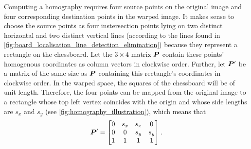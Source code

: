 \documentclass[../report.tex]{subfiles}
\begin{document}
Computing a homography requires four source points on the original image and four corresponding destination points in the warped image.
It makes sense to choose the source points as four instersection points lying on two distinct horizontal and two distinct vertical lines (according to the lines found in \cref{fig:board_localisation_line_detection_elimination}) because they represent a rectangle on the chessboard.
Let the $3 \times 4$ matrix ${\bm{P}}$ contain these points' homogenous coordinates as column vectors in clockwise order.
Further, let ${\bm{P}}'$ be a matrix of the same size as ${\bm{P}}$ containing this rectangle's coordinates in clockwise order.
In the warped space, the squares of the chessboard will be of unit length. 
Therefore, the four points can be mapped from the original image to a rectangle whose top left vertex coincides with the origin and whose side lengths are $s_x$ and $s_y$ (see \cref{fig:homography_illustration}), which means that
\begin{equation*}
    {\bm{P}}' = \begin{bmatrix}
        0 & s_x & s_x & 0 \\
        0 & 0 & s_y & s_y \\
        1 & 1 & 1 & 1
    \end{bmatrix}.
\end{equation*}%
\end{document}
